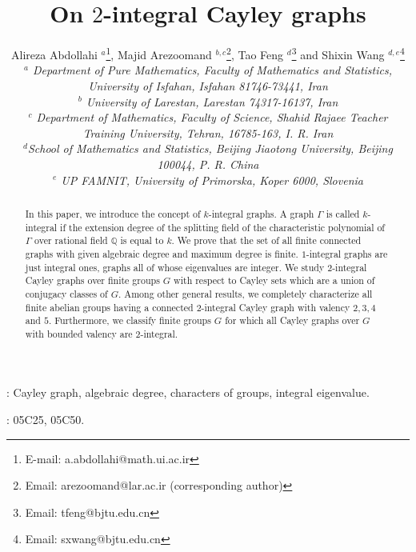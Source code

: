 \documentclass[12pt,a4paper]{article}
\begin{document}
	
	\title{On $2$-integral Cayley graphs}
	\author{Alireza Abdollahi $^{a}$\footnote{E-mail:
			a.abdollahi@math.ui.ac.ir }, Majid Arezoomand $^{b,c}$\footnote{Email: arezoomand@lar.ac.ir (corresponding author)}, Tao Feng $^{d}$\footnote{Email: tfeng@bjtu.edu.cn} and Shixin Wang $^{d,e}$\footnote{Email: sxwang@bjtu.edu.cn}\\
		{\small\em$^a$ Department of Pure Mathematics, Faculty of Mathematics and Statistics,}\\ 
		{\small\em University of Isfahan, Isfahan 81746-73441, Iran}\\
		{\small\em$^b$ University of Larestan, Larestan 74317-16137, Iran}\\
		{\small\em$^c$ Department of Mathematics, Faculty of Science, Shahid Rajaee Teacher Training
			University, Tehran, 16785-163, I. R. Iran}\\
		{\small\em$^d$School of Mathematics and Statistics, Beijing Jiaotong University, Beijing 100044, P. R. China}\\
		{\small\em$^e$ UP FAMNIT, University of Primorska, Koper 6000, Slovenia}\\
	}
	\date{}
	\maketitle
	
	\begin{abstract} In this paper, we introduce the concept of $k$-integral graphs. A graph $\Gamma$ is called $k$-integral if the extension degree of the splitting field of the characteristic polynomial of $\Gamma$ over rational field $\mathbb Q$ is equal to $k$. We prove that  the set of all finite connected graphs with given algebraic degree and maximum degree is finite. $1$-integral graphs are just integral ones, graphs all of whose eigenvalues are integer. We study
		$2$-integral Cayley graphs over finite groups $G$ with respect to  Cayley sets which are a union of conjugacy classes of $G$. Among other general results, we completely characterize all finite abelian groups having a connected $2$-integral Cayley graph with valency $2,3,4$ and $5$.
		Furthermore, we classify finite groups $G$ for which all Cayley graphs over $G$ with bounded valency are $2$-integral.	
	\end{abstract}	
	: Cayley graph, algebraic degree, characters of groups, integral eigenvalue.
	
	: 05C25, 05C50.
	
\end{document}
